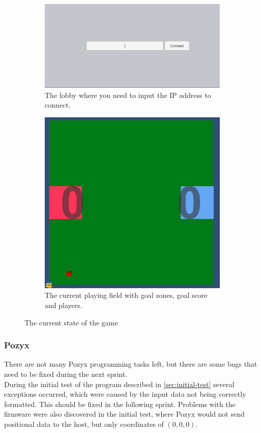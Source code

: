 \begin{figure}[H]
    \centering
    \begin{subfigure}{.5\textwidth}
        \centering
        \includegraphics[width=1\linewidth]{figures/sprint-4-lobby.PNG}
        \caption{The lobby where you need to input the IP address to connect.}
        \label{fig:sprint-4-lobby}
    \end{subfigure}
    \begin{subfigure}{.4\textwidth}
        \centering
        \includegraphics[width=.8\linewidth]{figures/sprint-4-game.PNG}
        \caption{The current playing field with goal zones, goal score and players.}
        \label{fig:sprint-4-game}
    \end{subfigure}
    \caption{The current state of the game}
    \label{fig:sprint-4-state-of-game}
\end{figure}

\subsubsection{Pozyx}
There are not many Pozyx programming tasks left, but there are some bugs that need to be fixed during the next sprint.
\\
During the initial test of the program described in \autoref{sec:initial-test} several exceptions occurred, which were caused by the input data not being correctly formatted.
This should be fixed in the following sprint.
Problems with the firmware were also discovered in the initial test, where Pozyx would not send positional data to the host, but only coordinates of $(0, 0, 0)$.

